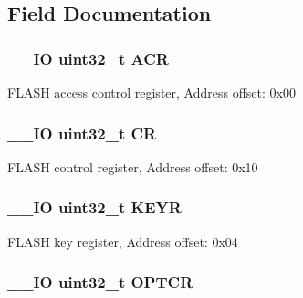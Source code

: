 \subsection{Field Documentation}
\hypertarget{struct_f_l_a_s_h___type_def_a9cb55206b29a8c16354747c556ab8bea}{
\subsubsection[{A\-C\-R}]{\setlength{\rightskip}{0pt plus 5cm}\-\_\-\-\_\-\-I\-O uint32\-\_\-t A\-C\-R}}\label{struct_f_l_a_s_h___type_def_a9cb55206b29a8c16354747c556ab8bea}
F\-L\-A\-S\-H access control register, Address offset\-: 0x00 \hypertarget{struct_f_l_a_s_h___type_def_ab40c89c59391aaa9d9a8ec011dd0907a}{
\subsubsection[{C\-R}]{\setlength{\rightskip}{0pt plus 5cm}\-\_\-\-\_\-\-I\-O uint32\-\_\-t C\-R}}\label{struct_f_l_a_s_h___type_def_ab40c89c59391aaa9d9a8ec011dd0907a}
F\-L\-A\-S\-H control register, Address offset\-: 0x10 \hypertarget{struct_f_l_a_s_h___type_def_a84c491be6c66b1d5b6a2efd0740b3d0c}{
\subsubsection[{K\-E\-Y\-R}]{\setlength{\rightskip}{0pt plus 5cm}\-\_\-\-\_\-\-I\-O uint32\-\_\-t K\-E\-Y\-R}}\label{struct_f_l_a_s_h___type_def_a84c491be6c66b1d5b6a2efd0740b3d0c}
F\-L\-A\-S\-H key register, Address offset\-: 0x04 \hypertarget{struct_f_l_a_s_h___type_def_acfef9b6d7da4271943edc04d7dfdf595}{
\subsubsection[{O\-P\-T\-C\-R}]{\setlength{\rightskip}{0pt plus 5cm}\-\_\-\-\_\-\-I\-O uint32\-\_\-t O\-P\-T\-C\-R}}\label{struct_f_l_a_s_h___type_def_acfef9b6d7da4271943edc04d7dfdf595}
